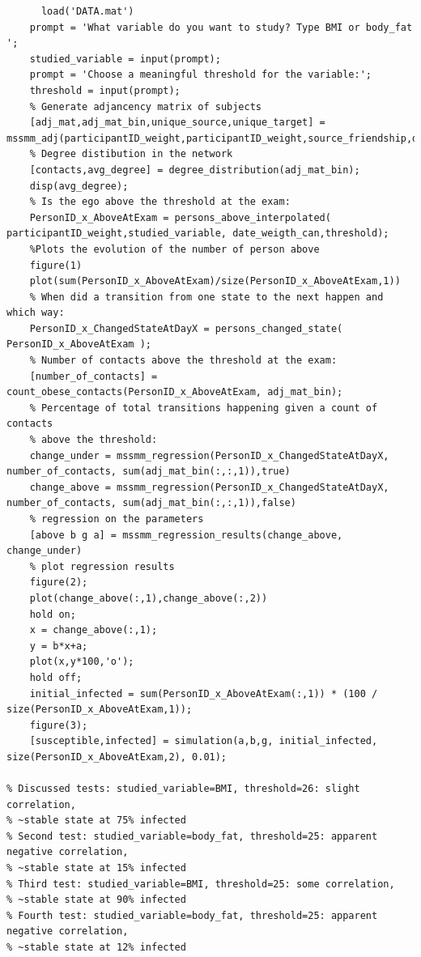 \documentclass[11pt]{article}
\begin{document}
\begin{verbatim}
      load('DATA.mat')
    prompt = 'What variable do you want to study? Type BMI or body_fat  ';
    studied_variable = input(prompt);
    prompt = 'Choose a meaningful threshold for the variable:';
    threshold = input(prompt);
    % Generate adjancency matrix of subjects
    [adj_mat,adj_mat_bin,unique_source,unique_target] = mssmm_adj(participantID_weight,participantID_weight,source_friendship,date_friendship_can);
    % Degree distibution in the network
    [contacts,avg_degree] = degree_distribution(adj_mat_bin);
    disp(avg_degree);
    % Is the ego above the threshold at the exam:
    PersonID_x_AboveAtExam = persons_above_interpolated( participantID_weight,studied_variable, date_weigth_can,threshold);
	%Plots the evolution of the number of person above
    figure(1)
    plot(sum(PersonID_x_AboveAtExam)/size(PersonID_x_AboveAtExam,1))
	% When did a transition from one state to the next happen and which way:
    PersonID_x_ChangedStateAtDayX = persons_changed_state( PersonID_x_AboveAtExam );
    % Number of contacts above the threshold at the exam:
    [number_of_contacts] = count_obese_contacts(PersonID_x_AboveAtExam, adj_mat_bin);
    % Percentage of total transitions happening given a count of contacts
    % above the threshold:
    change_under = mssmm_regression(PersonID_x_ChangedStateAtDayX, number_of_contacts, sum(adj_mat_bin(:,:,1)),true)
    change_above = mssmm_regression(PersonID_x_ChangedStateAtDayX, number_of_contacts, sum(adj_mat_bin(:,:,1)),false)
    % regression on the parameters
    [above b g a] = mssmm_regression_results(change_above, change_under)
    % plot regression results
    figure(2);
    plot(change_above(:,1),change_above(:,2))
    hold on;
    x = change_above(:,1);
    y = b*x+a;
    plot(x,y*100,'o');
    hold off;
    initial_infected = sum(PersonID_x_AboveAtExam(:,1)) * (100 / size(PersonID_x_AboveAtExam,1));
    figure(3);
    [susceptible,infected] = simulation(a,b,g, initial_infected, size(PersonID_x_AboveAtExam,2), 0.01);

% Discussed tests: studied_variable=BMI, threshold=26: slight correlation,
% ~stable state at 75% infected
% Second test: studied_variable=body_fat, threshold=25: apparent negative correlation,
% ~stable state at 15% infected
% Third test: studied_variable=BMI, threshold=25: some correlation,
% ~stable state at 90% infected
% Fourth test: studied_variable=body_fat, threshold=25: apparent negative correlation,
% ~stable state at 12% infected

\end{verbatim}
\end{document}

